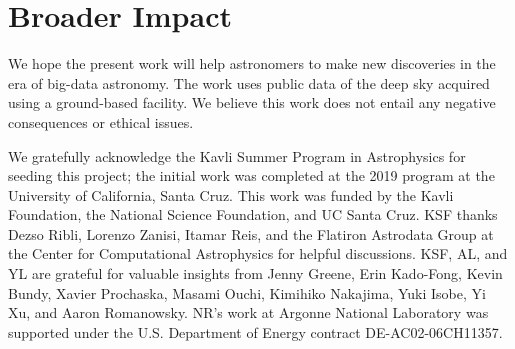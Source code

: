 \documentclass{article}
\begin{document}
\section*{Broader Impact}

We hope the present work will help astronomers to make new discoveries in the era of big-data astronomy. 
The work uses public data of the deep sky acquired using a ground-based facility. 
We believe this work does not entail any negative consequences or ethical issues.

\begin{ack}
We gratefully acknowledge the Kavli Summer Program in Astrophysics for seeding this project; the initial work was completed at the 2019 program at the University of California, Santa Cruz.
This work was funded by the Kavli Foundation, the National Science Foundation, and UC Santa Cruz.
KSF thanks Dezso Ribli, Lorenzo Zanisi, Itamar Reis, and the Flatiron Astrodata Group at the Center for Computational Astrophysics for helpful discussions.
KSF, AL, and YL are grateful for valuable insights from Jenny Greene, Erin Kado-Fong, Kevin Bundy, Xavier Prochaska, Masami Ouchi, Kimihiko Nakajima, Yuki Isobe, Yi Xu, and Aaron Romanowsky.
NR's work at Argonne National Laboratory was supported under the U.S. Department of Energy contract DE-AC02-06CH11357. 
\end{ack}



\end{document}
